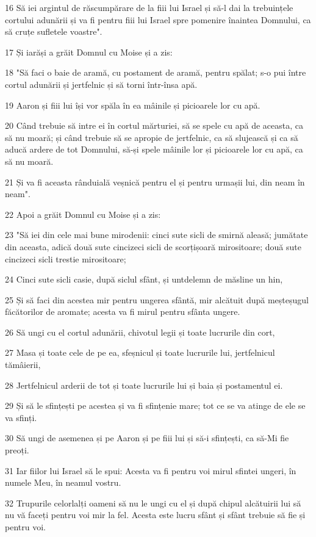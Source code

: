 \par 16 Să iei argintul de răscumpărare de la fiii lui Israel și să-l dai la trebuințele cortului adunării și va fi pentru fiii lui Israel spre pomenire înaintea Domnului, ca să cruțe sufletele voastre".
\par 17 Și iarăși a grăit Domnul cu Moise și a zis:
\par 18 "Să faci o baie de aramă, cu postament de aramă, pentru spălat; s-o pui între cortul adunării și jertfelnic și să torni într-însa apă.
\par 19 Aaron și fiii lui își vor spăla în ea mâinile și picioarele lor cu apă.
\par 20 Când trebuie să intre ei în cortul mărturiei, să se spele cu apă de aceasta, ca să nu moară; și când trebuie să se apropie de jertfelnic, ca să slujească și ca să aducă ardere de tot Domnului, să-și spele mâinile lor și picioarele lor cu apă, ca să nu moară.
\par 21 Și va fi aceasta rânduială veșnică pentru el și pentru urmașii lui, din neam în neam".
\par 22 Apoi a grăit Domnul cu Moise și a zis:
\par 23 "Să iei din cele mai bune mirodenii: cinci sute sicli de smirnă aleasă; jumătate din aceasta, adică două sute cincizeci sicli de scorțișoară mirositoare; două sute cincizeci sicli trestie mirositoare;
\par 24 Cinci sute sicli casie, după siclul sfânt, și untdelemn de măsline un hin,
\par 25 Și să faci din acestea mir pentru ungerea sfântă, mir alcătuit după meșteșugul făcătorilor de aromate; acesta va fi mirul pentru sfânta ungere.
\par 26 Să ungi cu el cortul adunării, chivotul legii și toate lucrurile din cort,
\par 27 Masa și toate cele de pe ea, sfeșnicul și toate lucrurile lui, jertfelnicul tămâierii,
\par 28 Jertfelnicul arderii de tot și toate lucrurile lui și baia și postamentul ei.
\par 29 Și să le sfințești pe acestea și va fi sfințenie mare; tot ce se va atinge de ele se va sfinți.
\par 30 Să ungi de asemenea și pe Aaron și pe fiii lui și să-i sfințești, ca să-Mi fie preoți.
\par 31 Iar fiilor lui Israel să le spui: Acesta va fi pentru voi mirul sfintei ungeri, în numele Meu, în neamul vostru.
\par 32 Trupurile celorlalți oameni să nu le ungi cu el și după chipul alcătuirii lui să nu vă faceți pentru voi mir la fel. Acesta este lucru sfânt și sfânt trebuie să fie și pentru voi.
